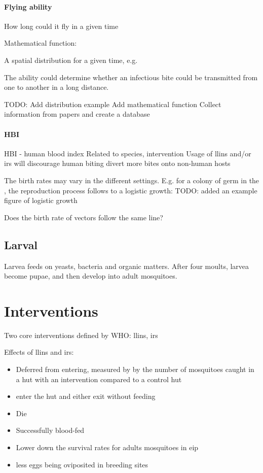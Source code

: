 \documentclass[a4paper, 12pt, twoside]{article}
\begin{document}
\paragraph{Flying ability}
How long could it fly in a given time

Mathematical function:

A spatial distribution for a given time, e.g.

The ability could determine whether an infectious bite could be transmitted from one to another in a long distance.

TODO:
Add distribution example
Add mathematical function
Collect information from papers and create a database
\paragraph{HBI}
HBI - human blood index
	Related to species, intervention
  Usage of \gls{llins} and/or \gls{irs} will discourage human biting divert more bites onto non-human hosts

	The birth rates may vary in the different settings. E.g. for a colony of germ in the , the reproduction process follows to a logistic growth:
TODO: added an example figure of logistic growth
	
	Does the birth rate of vectors follow the same line?

\subsection{Larval}

Larvea feeds on yeasts, bacteria and organic matters. After four moults, larvea become pupae, and then develop into adult mosquitoes.

\section{Interventions}

Two core interventions defined by WHO: \gls{llins}, \gls{irs}

Effects of \gls{llins} and \gls{irs}:

\begin{itemize}
\item Deferred from entering, measured by by the number of mosquitoes caught in a hut with an intervention compared to a control hut
\item enter the hut and either exit without feeding
\item Die
\item Successfully blood-fed
\item Lower down the survival rates for adults mosquitoes in \gls{eip} 
\item less eggs being oviposited in breeding sites
\end{itemize}
\end{document}
